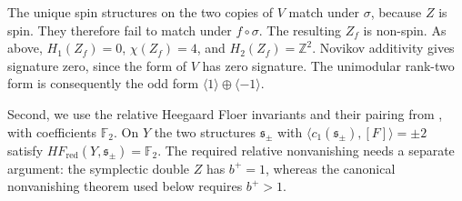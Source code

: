 \documentclass[11pt]{amsart}
\theoremstyle{definition}
\theoremstyle{remark}
\newcommand{\Z}{\mathbb Z}
\newcommand{\Ftwo}{\mathbb F_2}
\begin{document}
The unique spin structures on the two copies of $V$ match under
$\sigma$, because $Z$ is spin. They therefore fail to match under
$f\circ\sigma$. The resulting $Z_f$ is non-spin. As above,
$H_1(Z_f)=0$, $\chi(Z_f)=4$, and $H_2(Z_f)=\Z^2$.
Novikov additivity gives signature zero, since the form of $V$
has zero signature. The unimodular rank-two form is consequently
the odd form $\langle1\rangle\oplus\langle-1\rangle$.

Second, we use the relative Heegaard Floer invariants and their
pairing from \cite[Lemmas 9--10]{LP25}, with coefficients $\Ftwo$.
On $Y$ the two structures $\mathfrak s_\pm$ with
$\langle c_1(\mathfrak s_\pm),[F]\rangle=\pm2$ satisfy
$HF_{\mathrm{red}}(Y,\mathfrak s_\pm)=\Ftwo$.
The required relative nonvanishing needs a separate argument:
the symplectic double $Z$ has $b^+=1$, whereas the canonical
nonvanishing theorem used below requires $b^+>1$.
\end{document}
